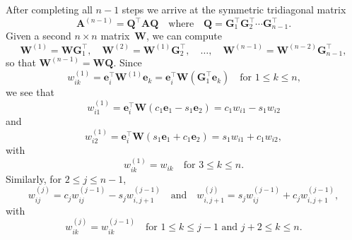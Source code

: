 \documentclass[12pt,a4paper]{article}
\newcommand{\bs}[1]{\boldsymbol{#1}}
\begin{document}
After completing all $n-1$ steps we arrive at the symmetric tridiagonal matrix
\[
\bs{A}^{(n-1)}=\bs{Q}^\top\bs{A}\bs{Q}\quad\text{where}\quad
\bs{Q}=\bs{G}_1^\top\bs{G}_2^\top\cdots\bs{G}_{n-1}^\top.
\]
Given a second $n\times n$ matrix~$\bs{W}$, we can compute
\[
\bs{W}^{(1)}=\bs{W}\bs{G}_1^\top,\quad
\bs{W}^{(2)}=\bs{W}^{(1)}\bs{G}_2^\top,\quad\ldots,\quad
\bs{W}^{(n-1)}=\bs{W}^{(n-2)}\bs{G}_{n-1}^\top,
\]
so that $\bs{W}^{(n-1)}=\bs{W}\bs{Q}$.  Since
\[
w^{(1)}_{ik}=\bs{e}_i^\top\bs{W}^{(1)}\bs{e}_k
	=\bs{e}_i^\top\bs{W}(\bs{G}_1^\top\bs{e}_k)
\quad\text{for $1\le k\le n$,}
\]
we see that
\[
w^{(1)}_{i1}=\bs{e}_i^\top\bs{W}(c_1\bs{e}_1-s_1\bs{e}_2)
	=c_1w_{i1}-s_1w_{i2}
\]
and
\[
w^{(1)}_{i2}=\bs{e}_i^\top\bs{W}(s_1\bs{e}_1+c_1\bs{e}_2)
	=s_1w_{i1}+c_1w_{i2},
\]
with
\[
w^{(1)}_{ik}=w_{ik}\quad\text{for $3\le k\le n$.}
\]
Similarly, for $2\le j\le n-1$,
\[
w^{(j)}_{ij}=c_jw^{(j-1)}_{ij}-s_jw^{(j-1)}_{i,j+1}
\quad\text{and}\quad
w^{(j)}_{i,j+1}=s_jw^{(j-1)}_{ij}+c_jw^{(j-1)}_{i,j+1},
\]
with
\[
w^{(j)}_{ik}=w^{(j-1)}_{ik}\quad\text{for $1\le k\le j-1$ and $j+2\le k\le n$.}
\]











\end{document}
